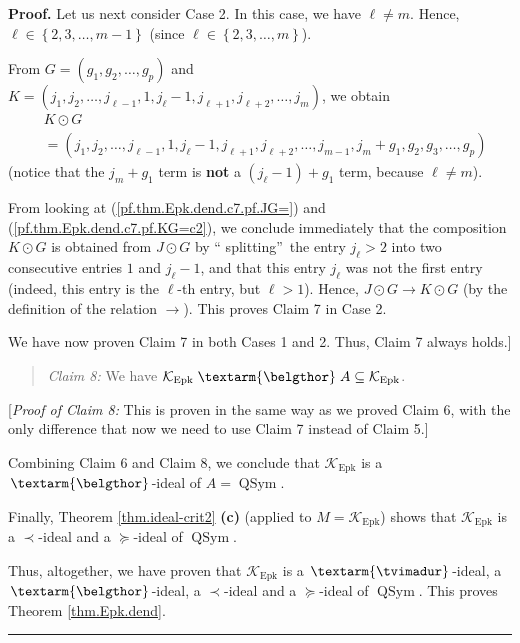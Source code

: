 \documentclass[numbers=enddot,12pt,final,onecolumn,notitlepage]{scrartcl}%
\theoremstyle{definition}
\newenvironment{statement}{\begin{quote}}{\end{quote}}
\newenvironment{proof}[1][Proof]{\noindent\textbf{#1.} }{\ \rule{0.5em}{0.5em}}
\newenvironment{verlong}{}{}
\newcommand{\tvi}{\left. \textarm{\tvimadur} \right.}
\newcommand{\bel}{\left. \textarm{\belgthor} \right.}
\begin{document}
\begin{verlong}
\begin{proof}
Let us next consider Case 2. In this case, we have $\ell\neq m$. Hence,
$\ell\in\left\{  2,3,\ldots,m-1\right\}  $ (since $\ell\in\left\{
2,3,\ldots,m\right\}  $).

From $G=\left(  g_{1},g_{2},\ldots,g_{p}\right)  $ and $K=\left(  j_{1}%
,j_{2},\ldots,j_{\ell-1},1,j_{\ell}-1,j_{\ell+1},j_{\ell+2},\ldots
,j_{m}\right)  $, we obtain%
\begin{align}
&  K\odot G\nonumber\\
&  =\left(  j_{1},j_{2},\ldots,j_{\ell-1},1,j_{\ell}-1,j_{\ell+1},j_{\ell
+2},\ldots,j_{m-1},j_{m}+g_{1},g_{2},g_{3},\ldots,g_{p}\right)
\label{pf.thm.Epk.dend.c7.pf.KG=c2}%
\end{align}
(notice that the $j_{m}+g_{1}$ term is \textbf{not} a $\left(  j_{\ell
}-1\right)  +g_{1}$ term, because $\ell\neq m$).

From looking at (\ref{pf.thm.Epk.dend.c7.pf.JG=}) and
(\ref{pf.thm.Epk.dend.c7.pf.KG=c2}), we conclude immediately that the
composition $K\odot G$ is obtained from $J\odot G$ by \textquotedblleft
splitting\textquotedblright\ the entry $j_{\ell}>2$ into two consecutive
entries $1$ and $j_{\ell}-1$, and that this entry $j_{\ell}$ was not the first
entry (indeed, this entry is the $\ell$-th entry, but $\ell>1$). Hence,
$J\odot G\rightarrow K\odot G$ (by the definition of the relation
$\rightarrow$). This proves Claim 7 in Case 2.

We have now proven Claim 7 in both Cases 1 and 2. Thus, Claim 7 always holds.]

\begin{statement}
\textit{Claim 8:} We have $\mathcal{K}_{\operatorname*{Epk}}\bel
A\subseteq\mathcal{K}_{\operatorname*{Epk}}$.
\end{statement}

[\textit{Proof of Claim 8:} This is proven in the same way as we proved Claim
6, with the only difference that now we need to use Claim 7 instead of Claim 5.]

Combining Claim 6 and Claim 8, we conclude that $\mathcal{K}%
_{\operatorname*{Epk}}$ is a $\bel  $-ideal of $A=\operatorname*{QSym}$.

Finally, Theorem \ref{thm.ideal-crit2} \textbf{(c)} (applied to $M=\mathcal{K}%
_{\operatorname*{Epk}}$) shows that $\mathcal{K}_{\operatorname*{Epk}}$ is a
$\left.  \prec\right.  $-ideal and a $\left.  \succeq\right.  $-ideal of
$\operatorname*{QSym}$.

Thus, altogether, we have proven that $\mathcal{K}_{\operatorname*{Epk}}$ is a
$\tvi$-ideal, a $\bel$-ideal, a $\left.  \prec\right.  $-ideal and a $\left.
\succeq\right.  $-ideal of $\operatorname*{QSym}$. This proves Theorem
\ref{thm.Epk.dend}.
\end{proof}


\end{verlong}
\end{document}
